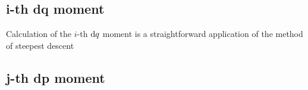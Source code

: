 \subsection{i-th dq moment}

Calculation of the \(i\)-th \(\mathrm{d} q\) moment is a straightforward application of the method of steepest descent

\subsection{j-th dp moment}